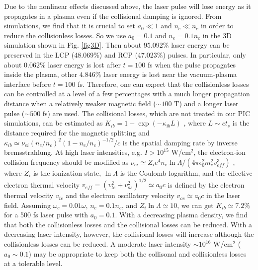 \documentclass[%
aps,
preprint,
showpacs,
preprintnumbers,
 amsmath,
 amssymb,
 prl,
]{revtex4-1}
\begin{document}
Due to the nonlinear effects discussed above, the laser pulse will lose energy as it propagates in a plasma even if the collisional damping is ignored.
From simulations, we find that it is crucial to set $a_0 \ll 1$ and $n_e \ll n_c$ in order to reduce the collisionless losses.
So we use $a_0=0.1$ and $n_e=0.1n_c$ in the 3D simulation shown in Fig. \ref{fig3D}.
Then about 95.092\% laser energy can be preserved in the LCP (48.069\%) and RCP (47.023\%) pulses. In particular, only about $0.062\%$ laser energy is lost after $t=100$ fs when the pulse propagates inside the plasma, other $4.846\%$ laser energy is lost near the vacuum-plasma interface before $t=100$ fs.
Therefore, one can expect that the collisionless losses can be controlled at a level of a few percentages with a much longer propagation distance when a relatively weaker magnetic field ($\sim 100$ T) and a longer laser pulse ($\sim 500$ fs) are used.
The collisional losses, which are not treated in our PIC simulations, can be estimated as $K_{ib}=1-\exp{(-\kappa_{ib} L)}$ \cite{EliezerBook}, where $L \sim c t_s$ is the distance required for the magnetic splitting and $\kappa_{ib} \simeq  \nu_{ei} (n_e/n_c)^2(1-n_e/n_c)^{-1/2}/c$ is the spatial damping rate by inverse bremsstrahlung.
At high laser intensities, e.g. $I > 10^{15}$ W/cm$^2$, the electron-ion collision frequency should be modified as $\nu_{ei}\simeq Z_i e^4 n_e \ln \Lambda / (4 \pi \epsilon_0^2 m_e^2 v_{eff}^3)$ \cite{GibbonBook, EliezerBook, WengPRE}, where $Z_i$ is the ionization state, $\ln \Lambda$ is the Coulomb logarithm, and the effective electron thermal velocity $v_{eff} = (v_{te}^2 + v_{os}^2)^{1/2} \simeq a_0 c$ is defined by the electron thermal velocity $v_{te}$ and the electron oscillatory velocity $v_{os} \simeq a_0c$ in the laser field.
Assuming $\omega_c=0.01\omega$, $n_e=0.1n_c$, and $Z_i \ln \Lambda \simeq 10$, we can get $K_{ib} \simeq 7.2\%$ for a 500 fs laser pulse with $a_0=0.1$.
With a decreasing plasma density, we find that both the collisionless losses and the collisional losses can be reduced.
With a decreasing laser intensity, however, the collisional losses will increase although the collisionless losses can be reduced. A moderate laser intensity $\sim 10^{16}$ W/cm$^2$ ($a_0 \sim 0.1$) may be appropriate to keep both the collisonal and collisionless losses at a tolerable level.
\end{document}

